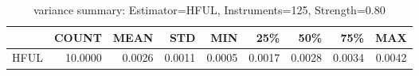 \begin{table}[ht]
\centering
\caption{variance summary: Estimator=HFUL, Instruments=125, Strength=0.80}
\begin{tabular}{lrrrrrrrr}
\toprule
 & COUNT & MEAN & STD & MIN & 25\% & 50\% & 75\% & MAX \\
\midrule
HFUL & 10.0000 & 0.0026 & 0.0011 & 0.0005 & 0.0017 & 0.0028 & 0.0034 & 0.0042 \\
\bottomrule
\end{tabular}
\end{table}
